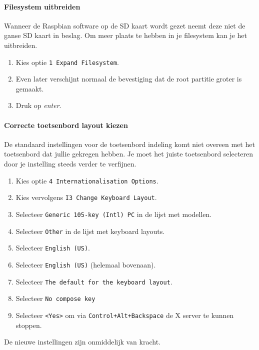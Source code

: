\documentclass[a4paper]{article}
\begin{document}
      \paragraph{Filesystem uitbreiden}
      Wanneer de Raspbian software op de SD kaart wordt gezet neemt
deze niet de ganse SD kaart in beslag.  Om meer plaats te hebben in je
filesystem kan je het uitbreiden.

      \begin{enumerate}
        \item Kies optie \texttt{1 Expand Filesystem}.
        \item Even later verschijnt normaal de bevestiging dat de root partitie
groter is gemaakt.  
        \item Druk op \emph{enter}.
      \end{enumerate}

      \paragraph{Correcte toetsenbord layout kiezen}
      De standaard instellingen voor de toetsenbord indeling komt niet
overeen met het toetsenbord dat jullie gekregen hebben.  Je moet het
juiste toetsenbord selecteren door je instelling steeds verder te
verfijnen.

      \begin{enumerate}
        \item Kies optie \texttt{4 Internationalisation Options}.
        \item Kies vervolgens \texttt{I3 Change Keyboard Layout}.
        \item Selecteer \texttt{Generic 105-key (Intl) PC} in de lijst met modellen.
        \item Selecteer \texttt{Other} in de lijst met keyboard layouts.
        \item Selecteer \texttt{English (US)}.
        \item Selecteer \texttt{English (US)} (helemaal bovenaan).
        \item Selecteer \texttt{The default for the keyboard layout}.
        \item Selecteer \texttt{No compose key}
        \item Selecteer \texttt{<Yes>} om via
\texttt{Control+Alt+Backspace} de X server te kunnen stoppen.
      \end{enumerate}

      De nieuwe instellingen zijn onmiddelijk van kracht.
\end{document}
